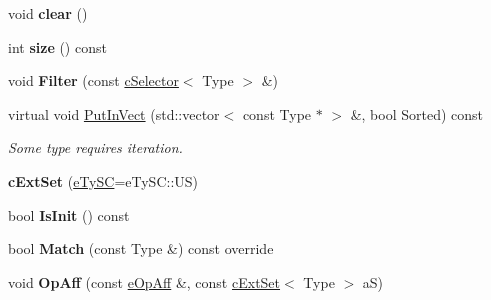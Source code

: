 \begin{DoxyCompactItemize}
\item 
void {\bfseries clear} ()\hypertarget{classMMVII_1_1cExtSet_a5f2f264fee23eb48816a66860b8a37cd}{}\label{classMMVII_1_1cExtSet_a5f2f264fee23eb48816a66860b8a37cd}

\item 
int {\bfseries size} () const \hypertarget{classMMVII_1_1cExtSet_a4d722b2cc31584d84d3b91e1eb1d109c}{}\label{classMMVII_1_1cExtSet_a4d722b2cc31584d84d3b91e1eb1d109c}

\item 
void {\bfseries Filter} (const \hyperlink{classMMVII_1_1cSelector}{c\+Selector}$<$ Type $>$ \&)\hypertarget{classMMVII_1_1cExtSet_af05e54bec9ae74f448076d3565400e10}{}\label{classMMVII_1_1cExtSet_af05e54bec9ae74f448076d3565400e10}

\item 
virtual void \hyperlink{classMMVII_1_1cExtSet_a27455779964456203a5aeb03cd32d43e}{Put\+In\+Vect} (std\+::vector$<$ const Type $\ast$ $>$ \&, bool Sorted) const \hypertarget{classMMVII_1_1cExtSet_a27455779964456203a5aeb03cd32d43e}{}\label{classMMVII_1_1cExtSet_a27455779964456203a5aeb03cd32d43e}

\begin{DoxyCompactList}\small\item\em Some type requires iteration. \end{DoxyCompactList}\item 
{\bfseries c\+Ext\+Set} (\hyperlink{MMVII__enums_8h_a04fcd74deb7c7ab4218cbb194a03239c}{e\+Ty\+SC}=e\+Ty\+S\+C\+::\+US)\hypertarget{classMMVII_1_1cExtSet_a0f92a76841f8f9d2a2545fecbbc3734e}{}\label{classMMVII_1_1cExtSet_a0f92a76841f8f9d2a2545fecbbc3734e}

\item 
bool {\bfseries Is\+Init} () const \hypertarget{classMMVII_1_1cExtSet_a001b826a63b564b6fff6e90a2d733070}{}\label{classMMVII_1_1cExtSet_a001b826a63b564b6fff6e90a2d733070}

\item 
bool {\bfseries Match} (const Type \&) const override\hypertarget{classMMVII_1_1cExtSet_abf913cbb365bd21732f5b170b1b627ae}{}\label{classMMVII_1_1cExtSet_abf913cbb365bd21732f5b170b1b627ae}

\item 
void {\bfseries Op\+Aff} (const \hyperlink{MMVII__enums_8h_a14edea285bb2396d1a1f9f30b782c271}{e\+Op\+Aff} \&, const \hyperlink{classMMVII_1_1cExtSet}{c\+Ext\+Set}$<$ Type $>$ aS)\hypertarget{classMMVII_1_1cExtSet_ad0c109be8687da8b99b4002e96f0a558}{}\label{classMMVII_1_1cExtSet_ad0c109be8687da8b99b4002e96f0a558}

\end{DoxyCompactItemize}
